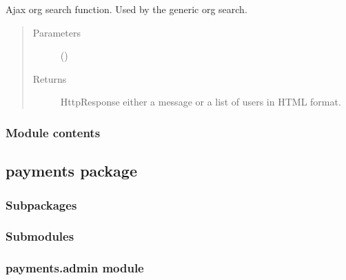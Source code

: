 \documentclass[letterpaper,10pt,english]{sphinxmanual}
\begin{document}
\begin{fulllineitems}
\label{\detokenize{organisations:organisations.views.org_search_ajax}}
Ajax org search function. Used by the generic org search.
\begin{quote}\begin{description}
\item[{Parameters}] \leavevmode
{} () \textendash{} 

\item[{Returns}] \leavevmode
HttpResponse \sphinxhyphen{} either a message or a list of users in HTML format.

\end{description}\end{quote}

\end{fulllineitems}



\subsubsection{Module contents}
\label{\detokenize{organisations:module-organisations}}\label{\detokenize{organisations:module-contents}}

\subsection{payments package}
\label{\detokenize{payments:payments-package}}\label{\detokenize{payments::doc}}

\subsubsection{Subpackages}
\label{\detokenize{payments:subpackages}}

\subsubsection{Submodules}
\label{\detokenize{payments:submodules}}

\subsubsection{payments.admin module}
\label{\detokenize{payments:module-payments.admin}}\label{\detokenize{payments:payments-admin-module}}
\end{document}

